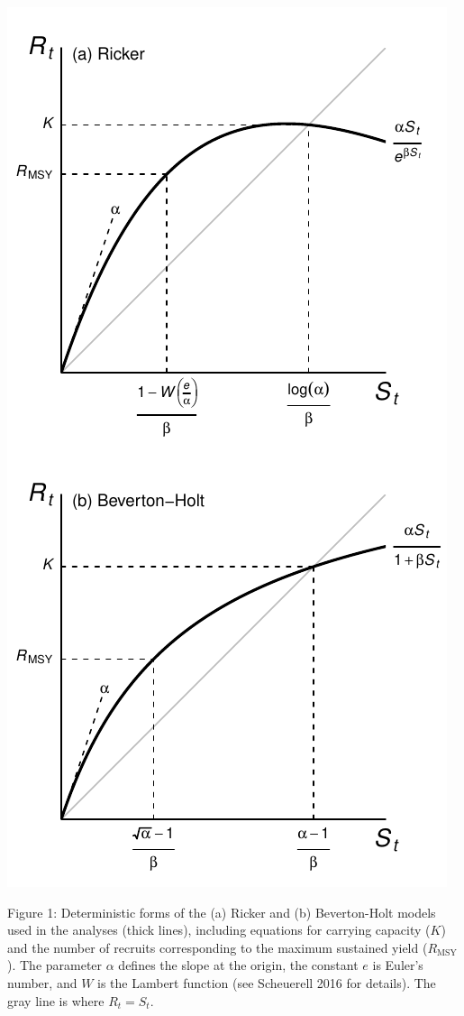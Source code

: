 \documentclass[
  11pt,
]{article}
\begin{document}
\begin{center}\includegraphics{App_3_Summarize_results_files/figure-latex/fig_1_model_forms-1} \end{center}

Figure 1: Deterministic forms of the (a) Ricker and (b) Beverton-Holt
models used in the analyses (thick lines), including equations for
carrying capacity (\(K\)) and the number of recruits corresponding to
the maximum sustained yield (\(R_{\text{MSY}}\)). The parameter
\(\alpha\) defines the slope at the origin, the constant \(e\) is
Euler's number, and \(W\) is the Lambert function (see Scheuerell 2016
for details). The gray line is where \(R_t = S_t\).
\end{document}
